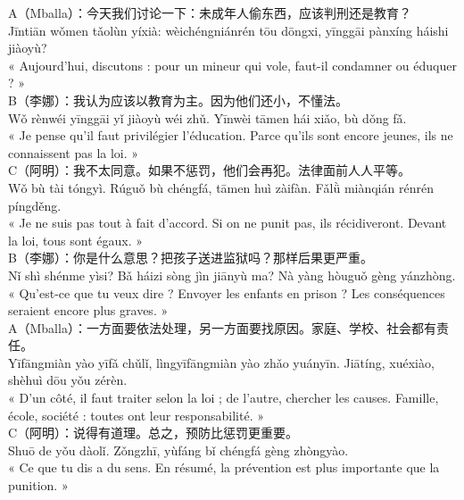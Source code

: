 \documentclass[11pt]{article}
\begin{document}
\begin{textebox}
A（Mballa）：今天我们讨论一下：未成年人偷东西，应该判刑还是教育？\\
Jīntiān wǒmen tǎolùn yíxià: wèichéngniánrén tōu dōngxi, yīnggāi pànxíng háishi jiàoyù?\\
« Aujourd'hui, discutons : pour un mineur qui vole, faut-il condamner ou éduquer ? »\\[4pt]
B（李娜）：我认为应该以教育为主。因为他们还小，不懂法。\\
Wǒ rènwéi yīnggāi yǐ jiàoyù wéi zhǔ. Yīnwèi tāmen hái xiǎo, bù dǒng fǎ.\\
« Je pense qu'il faut privilégier l'éducation. Parce qu'ils sont encore jeunes, ils ne connaissent pas la loi. »\\[4pt]
C（阿明）：我不太同意。如果不惩罚，他们会再犯。法律面前人人平等。\\
Wǒ bù tài tóngyì. Rúguǒ bù chéngfá, tāmen huì zàifàn. Fǎlǜ miànqián rénrén píngděng.\\
« Je ne suis pas tout à fait d'accord. Si on ne punit pas, ils récidiveront. Devant la loi, tous sont égaux. »\\[4pt]
B（李娜）：你是什么意思？把孩子送进监狱吗？那样后果更严重。\\
Nǐ shì shénme yìsi? Bǎ háizi sòng jìn jiānyù ma? Nà yàng hòuguǒ gèng yánzhòng.\\
« Qu'est-ce que tu veux dire ? Envoyer les enfants en prison ? Les conséquences seraient encore plus graves. »\\[4pt]
A（Mballa）：一方面要依法处理，另一方面要找原因。家庭、学校、社会都有责任。\\
Yīfāngmiàn yào yīfǎ chǔlǐ, lìngyīfāngmiàn yào zhǎo yuányīn. Jiātíng, xuéxiào, shèhuì dōu yǒu zérèn.\\
« D'un côté, il faut traiter selon la loi ; de l'autre, chercher les causes. Famille, école, société : toutes ont leur responsabilité. »\\[4pt]
C（阿明）：说得有道理。总之，预防比惩罚更重要。\\
Shuō de yǒu dàolǐ. Zǒngzhī, yùfáng bǐ chéngfá gèng zhòngyào.\\
« Ce que tu dis a du sens. En résumé, la prévention est plus importante que la punition. »
\end{textebox}
\end{document}
